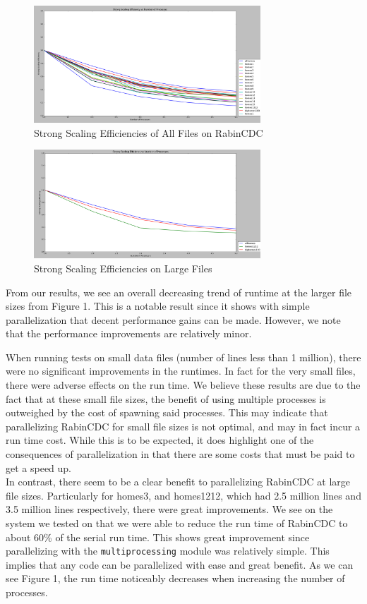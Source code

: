 \documentclass{acmtog} %
\begin{document}
	
	\begin{figure}
				\centerline{\includegraphics[width=8.5cm]{img/StrongScalingAllFiles}}
				\caption{Strong Scaling Efficiencies of All Files on RabinCDC}
				\label{fig:strongscale}
	\end{figure}
		\begin{figure}
			\centerline{\includegraphics[width=8.5cm]{img/StrongScalingLargeFile}}
			\caption{Strong Scaling Efficiencies on Large Files}
			\label{fig:strongscalelarge}
		\end{figure}
	From our results, we see an overall decreasing trend of runtime at the larger file sizes from Figure 1. This is a notable result since it shows with simple parallelization that decent performance gains can be made. However, we note that the performance improvements are relatively minor.
	
	When running tests on small data files (number of lines less than 1 million), there were no significant improvements in the runtimes. In fact for the very small files, there were adverse effects on the run time. We believe these results are due to the fact that at these small file sizes, the benefit of using multiple processes is outweighed by the cost of spawning said processes. This may indicate that parallelizing RabinCDC for small file sizes is not optimal, and may in fact incur a run time cost. While this is to be expected, it does highlight one of the consequences of parallelization in that there are some costs that must be paid to get a speed up.\\
	
	In contrast, there seem to be a clear benefit to parallelizing RabinCDC at large file sizes. Particularly for homes3, and homes1212, which had 2.5 million lines and 3.5 million lines respectively, there were great improvements. We see on the system we tested on that we were able to reduce the run time of RabinCDC to about 60\% of the serial run time. This shows great improvement since parallelizing with the \texttt{multiprocessing} module was relatively simple. This implies that any code can be parallelized with ease and great benefit. As we can see Figure 1, the run time noticeably decreases when increasing the number of processes. 
	
\end{document}
